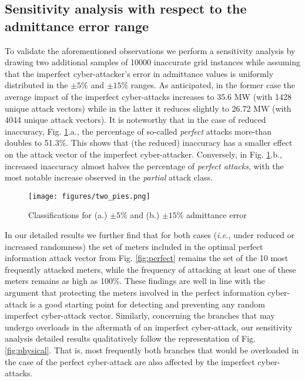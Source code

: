\documentclass{IEEEtran4PSCC}
\begin{document}
\subsection{Sensitivity analysis with respect to the admittance error range}
To validate the aforementioned observations we perform a sensitivity analysis by drawing two additional samples of 10000 inaccurate grid instances while assuming that the imperfect cyber-attacker's error in admittance values is uniformly distributed in the $\pm5\%$ and $\pm15\%$ ranges. As anticipated, in the former case the average impact of the imperfect cyber-attacks increases to 35.6 MW  (with 1428 unique attack vectors) while in the latter it reduces slightly to 26.72 MW (with 4044 unique attack vectors).  It is noteworthy that in the case of reduced inaccuracy, Fig. \ref{fig:two_pies}.a., the percentage of so-called \emph{perfect} attacks more-than doubles to 51.3\%. This shows that (the reduced) inaccuracy has a smaller effect on the attack vector of the imperfect cyber-attacker. Conversely, in
Fig. \ref{fig:two_pies}.b., increased inaccuracy almost halves the percentage of \emph{perfect attacks}, with the most notable increase observed in the \emph{partial} attack class.

\begin{figure}[h]
\centering
\texttt{[image: figures/two\_pies.png]}
\caption{Classifications for (a.) $\pm5\%$ and (b.) $\pm15\%$ admittance error}
\label{fig:two_pies}
\end{figure}


In our detailed results we further find that for both cases (\textit{i.e.}, under reduced or increased randomness) the set of meters included in the optimal perfect information attack vector from Fig. \ref{fig:perfect} remains the set of the 10 most frequently attacked meters, while the frequency of attacking at least one of these meters remains as high as 100\%. These findings are well in line with the argument that protecting the meters involved in the perfect information cyber-attack is a good starting point for detecting and preventing any random  imperfect cyber-attack vector. Similarly, concerning the branches that may undergo overloads in the aftermath of an imperfect cyber-attack, our sensitivity analysis detailed results qualitatively follow the representation of  {Fig.} \ref{fig:physical}. That is, most frequently both branches that would be overloaded in the case of the perfect cyber-attack are also affected by the imperfect cyber-attacks. 
\end{document}
